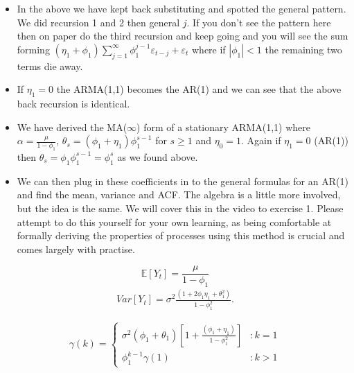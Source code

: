 \documentclass[openany]{tufte-book} %
\begin{document}
\begin{itemize}
\item In the above we have kept back substituting and spotted the general pattern. We did recursion 1 and 2 then general $j$. If you don't see the pattern here then on paper do the third recursion and keep going and you will see the sum forming $(\eta_1+\phi_1)\sum_{j=1}^\infty \phi_1^{j-1} \varepsilon_{t-j}+\varepsilon_t$ where if $|\phi_1|<1$ the remaining two terms die away. 

 \item If $\eta_1=0$ the ARMA(1,1) becomes the AR(1) and we can see that the above back recursion is identical.

 \item We have derived the MA($\infty$) form of a stationary ARMA(1,1) where $\alpha=\frac{\mu}{1-\phi_1}$, $\theta_s=(\phi_1+\eta_1)\phi_1^{s-1}$ for $s\geq 1$ and $\eta_0=1$. Again if $\eta_1=0$ (AR(1)) then $\theta_s=\phi_1\phi_1^{s-1}=\phi_1^s$ as we found above.

     \item We can then plug in these coefficients in to the general formulas for an AR(1) and find the mean, variance and ACF. The algebra is a little more involved, but the idea is the same. We will cover this in the video to exercise 1. Please attempt to do this yourself for your own learning, as  being comfortable at formally deriving the properties of processes using this method is crucial and comes largely with practise.


\end{itemize}



\begin{equation*} \mathbb{E}[Y_t]=\frac{\mu}{1-\phi_1} \end{equation*}
\begin{eqnarray*}
Var[Y_{t}]=\sigma ^{2}\frac{(1+2\phi _{1}\eta _{1}+\theta _{1}^{2})}{1-\phi_{1}^{2}}.
\end{eqnarray*}


\[\gamma(k) =\left\{
  \begin{array}{lr}
   \sigma^{2}(\phi_1+\theta_1)\left[1+\frac{(\phi_1+\eta_1)}{1-\phi_1^2} \right]   & : k =1\\
    \phi_1^{k-1}\gamma(1) & : k>1
  \end{array}
\right.
\]
\end{document}
